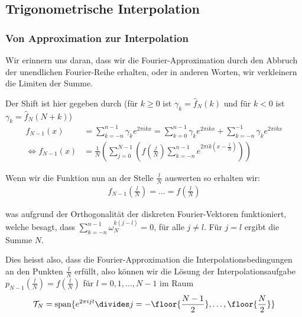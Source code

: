 
\newsection
\subsection{Trigonometrische Interpolation}
\subsubsection{Von Approximation zur Interpolation}
Wir erinnern uns daran, dass wir die Fourier-Approximation durch den Abbruch der unendlichen Fourier-Reihe erhalten, oder in anderen Worten, wir verkleinern die Limiten der Summe.


Der Shift ist hier gegeben durch (für $k \geq 0$ ist $\gamma_k = \hat{f}_N(k)$ und für $k < 0$ ist $\gamma_k = \hat{f}_N(N + k)$)
\begin{align*}
    f_{N - 1}(x)                 & = \sum_{k = -n}^{n - 1} \gamma_k e^{2 \pi ikx} = \sum_{k = 0}^{n - 1} \gamma_k e^{2\pi ikx} + \sum_{k = -n}^{-1} \gamma_k e^{2\pi ikx} \\
    \Leftrightarrow f_{N - 1}(x) & = \frac{1}{N} \left( \sum_{j = 0}^{N - 1} \left( f\left( \frac{j}{N} \right)
        \sum_{k = -n}^{n - 1} e^{2\pi ik \left( x - \frac{j}{N} \right)} \right) \right)
\end{align*}

\vspace{-1pc}

Wenn wir die Funktion nun an der Stelle $\frac{l}{N}$ auswerten so erhalten wir:
\rmvspace
\begin{align*}
    f_{N - 1}\left( \frac{l}{N} \right) = \ldots = f\left( \frac{l}{N} \right)
\end{align*}

\vspace{-1.8pc}
was aufgrund der Orthogonalität der diskreten Fourier-Vektoren funktioniert, welche besagt, dass $\displaystyle \sum_{k = -n}^{n - 1} \omega_N^{k(j - l)} = 0$, für alle $j \neq l$.
Für $j = l$ ergibt die Summe $N$.

Dies heisst also, dass die Fourier-Approximation die Interpolationsbedingungen an den Punkten $\frac{l}{N}$ erfüllt,
also können wir die Lösung der Interpolationsaufgabe $p_{N - 1} \left( \frac{l}{N} \right) = f\left( \frac{l}{N} \right)$ für $l = 0, 1, \ldots, N - 1$ im Raum
\rmvspace
\begin{align*}
    \mathcal{T}_N = \text{span}\{ e^{2\pi ijt} \divides j = - \floor{\frac{N - 1}{2}}, \ldots, \floor{\frac{N}{2}} \}
\end{align*}

